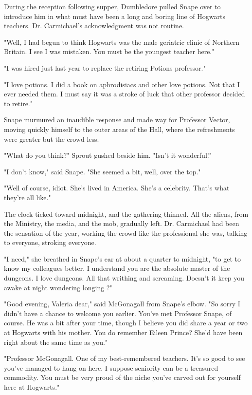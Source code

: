 During the reception following supper, Dumbledore pulled Snape over to introduce him in what must have been a long and boring line of Hogwarts teachers. Dr. Carmichael's acknowledgment was not routine.

"Well, I had begun to think Hogwarts was the male geriatric clinic of Northern Britain. I see I was mistaken. You must be the youngest teacher here."

"I was hired just last year to replace the retiring Potions professor."

"I love potions. I did a book on aphrodisiacs and other love potions. Not that I ever needed them. I must say it was a stroke of luck that other professor decided to retire."

Snape murmured an inaudible response and made way for Professor Vector, moving quickly himself to the outer areas of the Hall, where the refreshments were greater but the crowd less.

"What do you think?" Sprout gushed beside him. "Isn't it wonderful!"

"I don't know," said Snape. "She seemed a bit, well, over the top."

"Well of course, idiot. She's lived in America. She's a celebrity. That's what they're all like."

The clock ticked toward midnight, and the gathering thinned. All the aliens, from the Ministry, the media, and the mob, gradually left. Dr. Carmichael had been the sensation of the year, working the crowd like the professional she was, talking to everyone, stroking everyone.

"I need," she breathed in Snape's ear at about a quarter to midnight, "to get to know my colleagues better. I understand you are the absolute master of the dungeons. I love dungeons. All that writhing and screaming. Doesn't it keep you awake at night{\el} wondering{\el} longing{\el} ?"

"Good evening, Valeria dear," said McGonagall from Snape's elbow. "So sorry I didn't have a chance to welcome you earlier. You've met Professor Snape, of course. He was a bit after your time, though I believe you did share a year or two at Hogwarts with his mother. You do remember Eileen Prince? She'd have been right about the same time as you."

"Professor McGonagall. One of my best-remembered teachers. It's so good to see you've managed to hang on here. I suppose seniority can be a treasured commodity. You must be very proud of the niche you've carved out for yourself here at Hogwarts."

